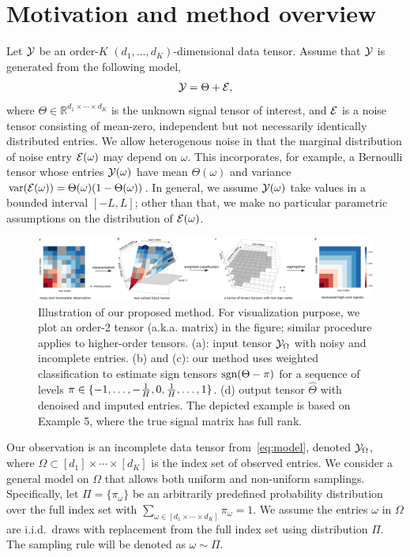 \documentclass{article}
\theoremstyle{plain}
\theoremstyle{definition}
\def\sign{\textup{sgn}}
\begin{document}
\section{Motivation and method overview}

Let $\mathcal{Y}$ be an order-$K$ $(d_1,\ldots,d_K)$-dimensional data tensor. Assume that $\mathcal{Y}$ is generated from the following model,
\begin{equation}\label{eq:model}
\mathcal{Y}=\Theta+\mathcal{E},
\end{equation}
where $\Theta\in\mathbb{R}^{d_1\times \cdots \times d_K}$ is the unknown signal tensor of interest, and $\mathcal{E}$ is a noise tensor consisting of mean-zero, independent but not necessarily identically distributed entries. We allow heterogenous noise in that the marginal distribution of noise entry $\mathcal{E}(\omega)$ may depend on $\omega$. This incorporates, for example, a Bernoulli tensor whose entries $\mathcal{Y}(\omega)$ have mean $\Theta(\omega)$ and variance $\text{var}(\mathcal{E}(\omega))=\Theta(\omega)(1-\Theta(\omega))$. In general, we assume $\mathcal{Y}(\omega)$ take values in a bounded interval $[-L, L]$; other than that, we make no particular parametric assumptions on the distribution of $\mathcal{E}(\omega)$.

\begin{figure}[h!]
\centerline{\includegraphics[width=1\textwidth]{image_new2.pdf}}
\caption{Illustration of our proposed method. For visualization purpose, we plot an order-2 tensor (a.k.a. matrix) in the figure; similar procedure applies to higher-order tensors. (a): input tensor $\mathcal{Y}_\Omega$ with noisy and incomplete entries. (b) and (c): our method uses weighted classification to estimate sign tensors $\sign(\Theta-\pi)$ for a sequence of levels $\pi\in \{-1,\ldots,-{1\over H},0,{1\over H},\ldots,1\}$. (d) output tensor $\hat \Theta$ with denoised and imputed entries. The depicted example is based on Example 5, where the true signal matrix has full rank. }\label{fig:demo}
\end{figure}

Our observation is an incomplete data tensor from~\eqref{eq:model}, denoted $\mathcal{Y}_\Omega$, where $\Omega\subset[d_1]\times\cdots\times[d_K]$ is the index set of observed entries. We consider a general model on $\Omega$ that allows both uniform and non-uniform samplings. Specifically, let $\Pi=\{\pi_\omega\}$ be an arbitrarily predefined probability distribution over the full index set with $\sum_{\omega\in[d_1\times \cdots \times d_K]}\pi_\omega=1$. We assume the entries $\omega$ in $\Omega$ are i.i.d.\ draws with replacement from the full index set using distribution $\Pi$. The sampling rule will be denoted as $\omega\sim \Pi$.
\end{document}
